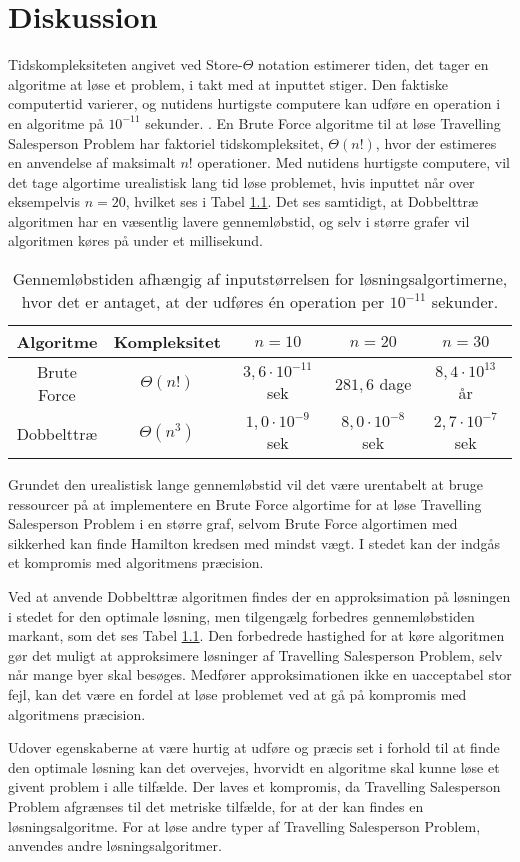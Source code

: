 \chapter{Diskussion}

Tidskompleksiteten angivet ved Store-$\Theta$ notation estimerer tiden, det tager en algoritme at løse et problem, i takt med at inputtet stiger. 
Den faktiske computertid varierer, og nutidens hurtigste computere kan udføre en operation i en algoritme på $10^{-11}$ sekunder. \cite{dmat}.
En Brute Force algoritme til at løse Travelling Salesperson Problem har faktoriel tidskompleksitet, $\Theta(n!)$, hvor der estimeres en anvendelse af maksimalt $n!$ operationer.
Med nutidens hurtigste computere, vil det tage algortime urealistisk lang tid løse problemet, hvis inputtet når over eksempelvis $n=20$, hvilket ses i Tabel \ref{tab_algtsp}. Det ses samtidigt, at Dobbelttræ algoritmen har en væsentlig lavere gennemløbstid, og selv i større grafer vil algoritmen køres på under et millisekund. 

\begin{table}[h]
 \centering
  \begin{tabular}{|c|c|c|c|c|}
   \hline
   Algoritme & Kompleksitet & $n=10$ & $n=20$ & $n=30$\\
   \hline
   Brute Force & $\Theta(n!)$ & $3,6 \cdot 10^{-11}$ sek & $281,6$ dage & $8,4 \cdot 10^{13}$ år \\
   \hline
   Dobbelttræ & $\Theta(n^3)$ & $1,0 \cdot 10^{-9}$ sek & $8,0 \cdot 10^{-8}$ sek & $2,7 \cdot 10^{-7}$ sek \\
   \hline
  \end{tabular}
 \caption{Gennemløbstiden afhængig af inputstørrelsen for løsningsalgortimerne, hvor det er antaget, at der udføres én operation per $10^{-11}$ sekunder.} \label{tab_algtsp}
\end{table}

Grundet den urealistisk lange gennemløbstid vil det være urentabelt at bruge ressourcer på at implementere en Brute Force algortime for at løse Travelling Salesperson Problem i en større graf, selvom Brute Force algortimen med sikkerhed kan finde Hamilton kredsen med mindst vægt. 
I stedet kan der indgås et kompromis med algoritmens præcision. 

Ved at anvende Dobbelttræ algoritmen findes der en approksimation på løsningen i stedet for den optimale løsning, men tilgengælg forbedres gennemløbstiden markant, som det ses Tabel \ref{tab_algtsp}. 
Den forbedrede hastighed for at køre algoritmen gør det muligt at approksimere løsninger af Travelling Salesperson Problem, selv når mange byer skal besøges. 
Medfører approksimationen ikke en uacceptabel stor fejl, kan det være en  fordel at løse problemet ved at gå på kompromis med algoritmens præcision.

Udover egenskaberne at være hurtig at udføre og præcis set i forhold til at finde den optimale løsning kan det overvejes, hvorvidt en algoritme skal kunne løse et givent problem i alle tilfælde. 
Der laves et kompromis, da Travelling Salesperson Problem afgrænses til det metriske tilfælde, for at der kan findes en løsningsalgoritme. For at løse andre typer af Travelling Salesperson Problem, anvendes andre løsningsalgoritmer. 